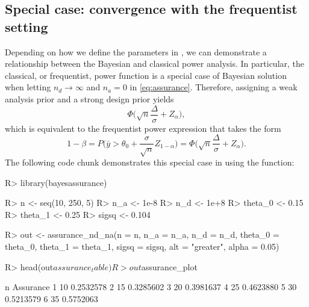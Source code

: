 \subsection{Special case: convergence with the frequentist setting}
Depending on how we define the parameters in 
, we can demonstrate a relationship between the Bayesian and classical power analysis. In particular, the classical, or frequentist, power function is a special case of Bayesian solution when letting $n_d \rightarrow \infty$ and $n_a = 0$ in \eqref{eq:assurance}. Therefore, assigning a weak analysis prior and a strong design prior yields
\begin{equation}
\label{eq:assurance_weakprior}
\Phi\Big(\sqrt{n}\frac{\Delta}{\sigma} + Z_\alpha\Big),
\end{equation}
which is equivalent to the frequentist power expression that takes the form
\begin{equation}
\nonumber
1-\beta = P\Big(\bar{y} > \theta_0 +
 \frac{\sigma}{\sqrt{n}}Z_{1-\alpha}\Big) = 
\Phi\Big(\sqrt{n}\frac{\Delta}{\sigma} + Z_\alpha\Big).
\end{equation}
The following code chunk demonstrates this special case 
in  using the  function: 

\begin{Schunk}
\begin{Sin}

R> library(bayesassurance)

R> n <- seq(10, 250, 5)
R> n_a <- 1e-8
R> n_d <- 1e+8
R> theta_0 <- 0.15
R> theta_1 <- 0.25
R> sigsq <- 0.104

R> out <- assurance_nd_na(n = n, n_a = n_a,  n_d = n_d, 
        theta_0 = theta_0, theta_1 = theta_1, sigsq = sigsq, 
        alt = "greater", alpha = 0.05)

R> head(out$assurance_table)
R> out$assurance_plot

\end{Sin}
\begin{Sout}
     n Assurance
1   10 0.2532578
2   15 0.3285602
3   20 0.3981637
4   25 0.4623880
5   30 0.5213579
6   35 0.5752063
\end{Sout}
\end{Schunk}


